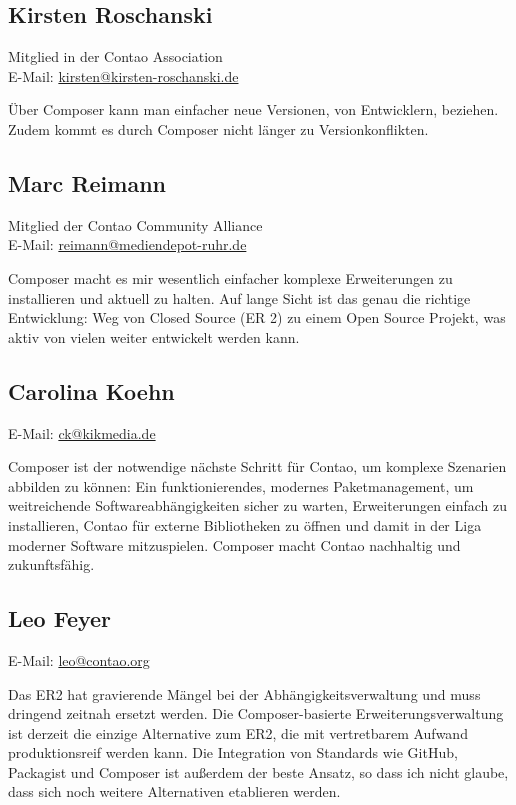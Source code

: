 \documentclass[
paper=a4,
draft=false,%
fontsize=10pt%
]{scrartcl}
\begin{document}
\subsection*{Kirsten  Roschanski}

Mitglied in der Contao Association \\
E-Mail: \href{mailto:kirsten@kirsten-roschanski.de}{kirsten@kirsten-roschanski.de}

Über Composer kann man einfacher neue Versionen, von Entwicklern, beziehen.  Zudem kommt es durch Composer nicht länger zu Versionkonflikten.

\subsection*{Marc  Reimann}

Mitglied der Contao Community Alliance \\
E-Mail: \href{mailto:reimann@mediendepot-ruhr.de}{reimann@mediendepot-ruhr.de}

Composer macht es mir wesentlich einfacher komplexe Erweiterungen zu installieren und aktuell zu halten. Auf lange Sicht ist das genau die richtige Entwicklung: Weg von Closed Source (ER 2) zu einem Open Source Projekt, was aktiv von vielen weiter entwickelt werden kann.

\subsection*{Carolina  Koehn}

E-Mail: \href{mailto:ck@kikmedia.de}{ck@kikmedia.de}

Composer ist der notwendige nächste Schritt für Contao, um komplexe Szenarien abbilden zu können: Ein funktionierendes, modernes  Paketmanagement, um weitreichende Softwareabhängigkeiten sicher zu warten, Erweiterungen einfach zu installieren, Contao für externe Bibliotheken zu öffnen und damit in der Liga moderner Software mitzuspielen. Composer macht Contao nachhaltig und zukunftsfähig.

\subsection*{Leo  Feyer}

E-Mail: \href{mailto:leo@contao.org}{leo@contao.org}

Das ER2 hat gravierende Mängel bei der Abhängigkeitsverwaltung und muss dringend zeitnah ersetzt werden. Die Composer-basierte Erweiterungsverwaltung ist derzeit die einzige Alternative zum ER2, die mit vertretbarem Aufwand produktionsreif werden kann. Die Integration von Standards wie GitHub, Packagist und Composer ist außerdem der beste Ansatz, so dass ich nicht glaube, dass sich noch weitere Alternativen etablieren werden.
\end{document}
